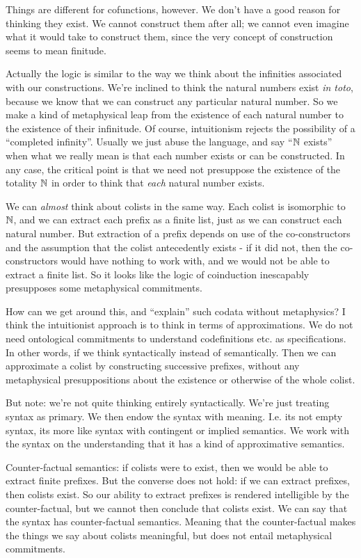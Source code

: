 \documentclass{article}
\begin{document}
Things are different for cofunctions, however. We don't have a good
reason for thinking they exist. We cannot construct them after all; we
cannot even imagine what it would take to construct them, since the
very concept of construction seems to mean finitude.

Actually the logic is similar to the way we think about the infinities
associated with our constructions. We're inclined to think the natural
numbers exist \textit{in toto}, because we know that we can construct
any particular natural number. So we make a kind of metaphysical leap
from the existence of each natural number to the existence of their
infinitude. Of course, intuitionism rejects the possibility of a
``completed infinity''. Usually we just abuse the language, and say
``\(\mathbb{N}\) exists'' when what we really mean is that each number
exists or can be constructed. In any case, the critical point is that
we need not presuppose the existence of the totality \(\mathbb{N}\) in order
to think that \textit{each} natural number exists.

We can \textit{almost} think about colists in the same way. Each
colist is isomorphic to \(\mathbb{N}\), and we can extract each prefix as a
finite list, just as we can construct each natural number. But
extraction of a prefix depends on use of the co-constructors and the
assumption that the colist antecedently exists - if it did not, then
the co-constructors would have nothing to work with, and we would not
be able to extract a finite list. So it looks like the logic of
coinduction inescapably presupposes some metaphysical commitments.

How can we get around this, and ``explain'' such codata without
metaphysics? I think the intuitionist approach is to think in terms of
approximations. We do not need ontological commitments to understand
codefinitions etc. as specifications. In other words, if we think
syntactically instead of semantically. Then we can approximate a
colist by constructing successive prefixes, without any metaphysical
presuppositions about the existence or otherwise of the whole colist.

But note: we're not quite thinking entirely syntactically. We're just
treating syntax as primary. We then endow the syntax with meaning.
I.e. its not empty syntax, its more like syntax with contingent or
implied semantics. We work with the syntax on the understanding that
it has a kind of approximative semantics.

Counter-factual semantics: if colists were to exist, then we would be
able to extract finite prefixes. But the converse does not hold: if we
can extract prefixes, then colists exist. So our ability to extract
prefixes is rendered intelligible by the counter-factual, but we
cannot then conclude that colists exist. We can say that the syntax
has counter-factual semantics. Meaning that the counter-factual makes
the things we say about colists meaningful, but does not entail
metaphysical commitments.
\end{document}

